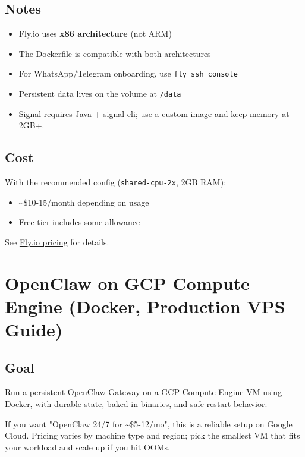 \subsection{Notes}


\begin{itemize}
  \item Fly.io uses \textbf{x86 architecture} (not ARM)
  \item The Dockerfile is compatible with both architectures
  \item For WhatsApp/Telegram onboarding, use \texttt{fly ssh console}
  \item Persistent data lives on the volume at \texttt{/data}
  \item Signal requires Java + signal-cli; use a custom image and keep memory at 2GB+.
\end{itemize}


\subsection{Cost}


With the recommended config (\texttt{shared-cpu-2x}, 2GB RAM):

\begin{itemize}
  \item \textasciitilde{}\$10-15/month depending on usage
  \item Free tier includes some allowance
\end{itemize}


See \href{https://fly.io/docs/about/pricing/}{Fly.io pricing} for details.


\clearpage

\section{OpenClaw on GCP Compute Engine (Docker, Production VPS Guide)}


\subsection{Goal}


Run a persistent OpenClaw Gateway on a GCP Compute Engine VM using Docker, with durable state, baked-in binaries, and safe restart behavior.

If you want "OpenClaw 24/7 for \textasciitilde{}\$5-12/mo", this is a reliable setup on Google Cloud.
Pricing varies by machine type and region; pick the smallest VM that fits your workload and scale up if you hit OOMs.

